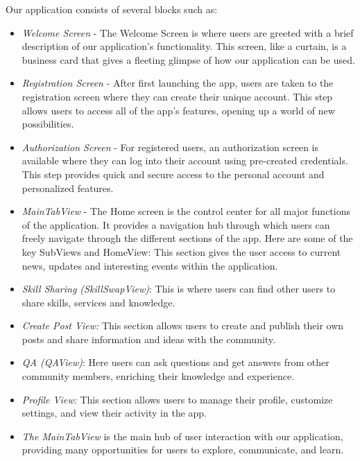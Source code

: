 Our  application consists of several blocks such as:
\begin{itemize}
    \item \textit{Welcome Screen} - The Welcome Screen is where users are greeted with a brief description of our application's functionality. This screen, like a curtain, is a business card that gives a fleeting glimpse of how our application can be used.
    \item \textit{Registration Screen} - After first launching the app, users are taken to the registration screen where they can create their unique account. This step allows users to access all of the app's features, opening up a world of new possibilities.
    \item \textit{Authorization Screen} - For registered users, an authorization screen is available where they can log into their account using pre-created credentials. This step provides quick and secure access to the personal account and personalized features.
    \item \textit{MainTabView} - The Home screen is the control center for all major functions of the application. It provides a navigation hub through which users can freely navigate through the different sections of the app. Here are some of the key SubViews and HomeView: This section gives the user access to current news, updates and interesting events within the application.
    \item \textit{Skill Sharing (SkillSwapView)}: This is where users can find other users to share skills, services and knowledge.
    \item \textit{Create Post View:} This section allows users to create and publish their own posts and share information and ideas with the community.
    \item \textit{QA (QAView)}: Here users can ask questions and get answers from other community members, enriching their knowledge and experience.
    \item \textit{Profile View:} This section allows users to manage their profile, customize settings, and view their activity in the app.
    \item \textit{The MainTabView} is the main hub of user interaction with our application, providing many opportunities for users to explore, communicate, and learn.
\end{itemize}

